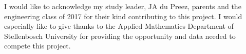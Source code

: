 

\begin{acknowledgements}      %


I would like to acknowledge my study leader, JA du Preez, parents and the engineering class of 2017 for their kind contributing to this project. I would especially like to give thanks to the Applied Mathematics Department of Stellenbosch University for providing the opportunity and data needed to compete this project.
\end{acknowledgements}


